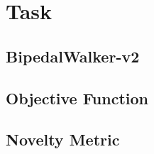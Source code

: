 \section{Task}
\subsection{BipedalWalker-v2}
\subsection{Objective Function}
\subsection{Novelty Metric}

